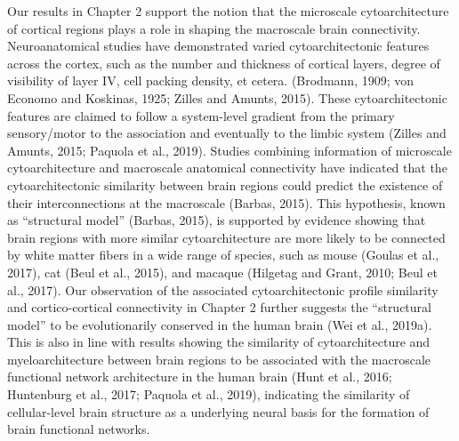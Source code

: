 \begin{refsection}
Our results in Chapter 2 support the notion that the microscale cytoarchitecture of cortical regions plays a role in shaping the macroscale brain connectivity. Neuroanatomical studies have demonstrated varied cytoarchitectonic features across the cortex, such as the number and thickness of cortical layers, degree of visibility of layer IV, cell packing density, et cetera. (Brodmann, 1909; von Economo and Koskinas, 1925; Zilles and Amunts, 2015). These cytoarchitectonic features are claimed to follow a system-level gradient from the primary sensory/motor to the association and eventually to the limbic system (Zilles and Amunts, 2015; Paquola et al., 2019). Studies combining information of microscale cytoarchitecture and macroscale anatomical connectivity have indicated that the cytoarchitectonic similarity between brain regions could predict the existence of their interconnections at the macroscale (Barbas, 2015). This hypothesis, known as “structural model” (Barbas, 2015), is supported by evidence showing that brain regions with more similar cytoarchitecture are more likely to be connected by white matter fibers in a wide range of species, such as mouse (Goulas et al., 2017), cat (Beul et al., 2015), and macaque (Hilgetag and Grant, 2010; Beul et al., 2017). Our observation of the associated cytoarchitectonic profile similarity and cortico-cortical connectivity in Chapter 2 further suggests the “structural model” to be evolutionarily conserved in the human brain (Wei et al., 2019a). This is also in line with results showing the similarity of cytoarchitecture and myeloarchitecture between brain regions to be associated with the macroscale functional network architecture in the human brain (Hunt et al., 2016; Huntenburg et al., 2017; Paquola et al., 2019), indicating the similarity of cellular-level brain structure as a underlying neural basis for the formation of brain functional networks.


\end{refsection}
